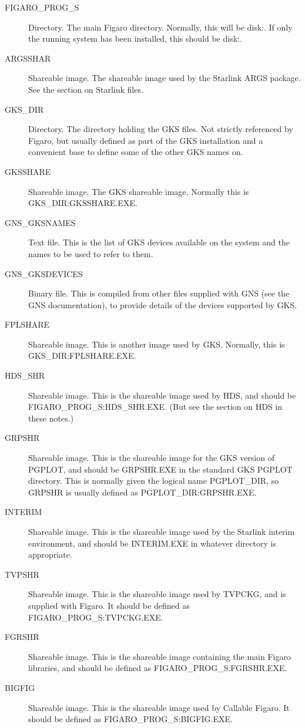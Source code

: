\begin{description}

\item [FIGARO\_PROG\_S] Directory. The main Figaro directory. Normally, this 
will be disk:. If only the running system has been 
installed, this should be disk:.

\item [ARGSSHAR] Shareable image. The shareable image used by the Starlink 
ARGS package. See the section on Starlink files.

\item [GKS\_DIR] Directory. The directory holding the GKS files. Not 
strictly referenced by Figaro, but usually defined as part of the GKS
installation and a convenient base to define some of the other GKS names
on.

\item [GKSSHARE] Shareable image. The GKS shareable image. Normally this is
GKS\_\-DIR:\-GKS\-SHARE.EXE.

\item [GNS\_GKSNAMES] Text file. This is the list of GKS devices 
available on the system and the names to be used to refer to them.

\item [GNS\_GKSDEVICES] Binary file. This is compiled from other files 
supplied with GNS (see the GNS documentation), to provide details of 
the devices supported by GKS.

\item [FPLSHARE] Shareable image. This is another image used by 
GKS. Normally, this is GKS\_\-DIR:\-FPLSHARE.EXE.

\item [HDS\_SHR] Shareable image. This is the shareable image used 
by HDS, and should be FIG\-ARO\_\-PROG\_S:HDS\_SHR.EXE. (But see the
section on HDS in these notes.)

\item [GRPSHR] Shareable image. This is the shareable image for the GKS 
version of PGPLOT, and should be GRPSHR.EXE in the standard GKS PGPLOT 
directory. This is normally given the logical name PGPLOT\_DIR, so GRPSHR 
is usually defined as PGPLOT\_DIR:\-GRPSHR.EXE.

\item [INTERIM] Shareable image. This is the shareable image used by the
Starlink interim environment, and should be INTERIM.EXE in whatever 
directory is appropriate.

\item [TVPSHR] Shareable image. This is the shareable image used by TVPCKG, and
is supplied with Figaro. It should be defined as FIGARO\_PROG\_S:TVPCKG.EXE.

\item [FGRSHR] Shareable image. This is the shareable image containing the main
Figaro libraries, and should be defined as FIGARO\_PROG\_S:FGRSHR.EXE.

\item [BIGFIG] Shareable image. This is the shareable image used by Callable 
Figaro. It should be defined as FIGARO\_PROG\_S:BIGFIG.EXE.

\end{description}

